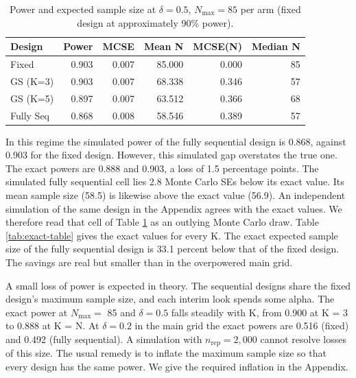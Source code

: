 \documentclass[
  11pt,
]{article}
\begin{document}
\begin{table}[!h]
\centering
\caption{\label{tab:power90-table}Power and expected sample size at $\delta = 0.5$, $N_{\max} = 85$ per arm (fixed design at approximately 90\% power).}
\centering
\fontsize{10}{12}\selectfont
\begin{tabular}[t]{lrrrrr}
\toprule
Design & Power & MCSE & Mean N & MCSE(N) & Median N\\
\midrule
Fixed & 0.903 & 0.007 & 85.000 & 0.000 & 85\\
GS (K=3) & 0.903 & 0.007 & 68.338 & 0.346 & 57\\
GS (K=5) & 0.897 & 0.007 & 63.512 & 0.366 & 68\\
Fully Seq & 0.868 & 0.008 & 58.546 & 0.389 & 57\\
\bottomrule
\end{tabular}
\end{table}

In this regime the simulated power of the fully
sequential design is
0.868,
against
0.903
for the fixed design. However, this simulated gap
overstates the true one. The exact powers are
0.888 and
0.903, a loss of
1.5
percentage points. The simulated fully sequential cell
lies
2.8
Monte Carlo SEs below its exact value. Its mean sample
size
(58.5)
is likewise above the exact value
(56.9).
An independent simulation of the same design in the
Appendix agrees with the exact values. We therefore
read that cell of Table \ref{tab:power90-table} as
an outlying Monte Carlo draw. Table \ref{tab:exact-table} gives the
exact values for every K. The exact expected sample
size of the fully sequential design is
33.1
percent below that of the fixed design. The savings
are real but smaller than in the overpowered main grid.

A small loss of power is expected in theory. The
sequential designs share the fixed design's maximum
sample size, and each interim look spends some alpha.
The exact power at \(N_{\max} =\) 85 and
\(\delta = 0.5\) falls steadily with K, from
0.900 at K = 3 to
0.888 at K = N. At
\(\delta = 0.2\) in the main grid the exact powers are
0.516 (fixed) and
0.492 (fully
sequential). A simulation with
\(n_{\mathrm{rep}} = 2{,}000\) cannot resolve losses of
this size. The usual remedy is to inflate the maximum
sample size so that every design has the same power.
We give the required inflation in the Appendix.
\end{document}

